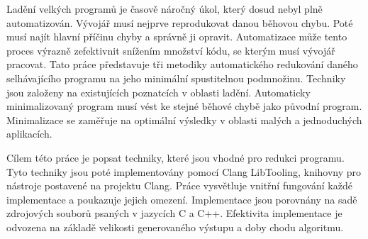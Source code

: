 \documentclass[12pt]{report}
\begin{document}

Ladění velkých programů je časově náročný úkol, který dosud nebyl plně automatizován. 
Vývojář musí nejprve reprodukovat danou běhovou chybu. 
Poté musí najít hlavní příčinu chyby a správně ji opravit. 
Automatizace může tento proces výrazně zefektivnit snížením množství kódu, se kterým 
musí vývojář pracovat. 
Tato práce představuje tři metodiky automatického redukování daného selhávajícího 
programu na jeho minimální spustitelnou podmnožinu. 
Techniky jsou založeny na existujících poznatcích v oblasti ladění. 
Automaticky minimalizovaný program musí vést ke stejné běhové chybě jako původní
program. 
Minimalizace se zaměřuje na optimální výsledky v oblasti malých a jednoduchých 
aplikacích.

Cílem této práce je popsat techniky, které jsou vhodné pro redukci programu. 
Tyto techniky jsou poté implementovány pomocí Clang LibTooling, knihovny 
pro nástroje postavené na projektu Clang. 
Práce vysvětluje vnitřní fungování každé implementace a poukazuje jejich omezení. 
Implementace jsou porovnány na sadě zdrojových souborů psaných v jazycích C a C++. 
Efektivita implementace je odvozena na základě velikosti generovaného výstupu a doby 
chodu algoritmu.
\end{document}
